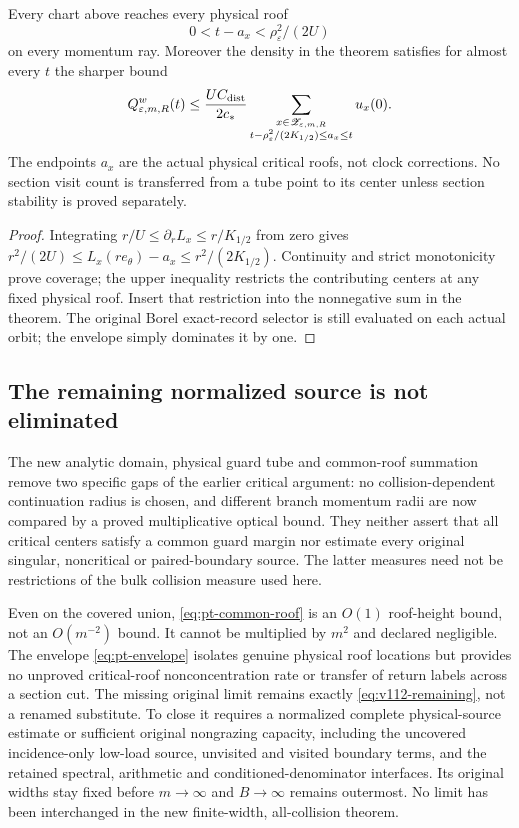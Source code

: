 \begin{corollary}
\label{cor:pt-envelope}
Every chart above reaches every physical roof
\[
 0<t-a_x<\rho_\varepsilon^2/(2U)
\]
on every momentum ray.  Moreover the density in the theorem satisfies
for almost every $t$ the sharper bound
\begin{equation}\label{eq:pt-envelope}
 Q^w_{\varepsilon,m,R}(t)
 \le\frac{U C_{\rm dist}}{2c_*}
 \sum_{\substack{x\in\mathscr Z_{\varepsilon,m,R}\\
       t-\rho_\varepsilon^2/(2K_{1/2})\le a_x\le t}}u_x(0).
\end{equation}
The endpoints $a_x$ are the actual physical critical roofs, not clock
corrections.  No section visit count is transferred from a tube point
to its center unless section stability is proved separately.
\end{corollary}
\begin{proof}
Integrating $r/U\le\partial_rL_x\le r/K_{1/2}$ from zero gives
$r^2/(2U)\le L_x(re_\theta)-a_x\le r^2/(2K_{1/2})$.
Continuity and strict monotonicity prove coverage; the upper inequality
restricts the contributing centers at any fixed physical roof.
Insert that restriction into the nonnegative sum in the theorem.
The original Borel exact-record selector is still evaluated on each
actual orbit; the envelope simply dominates it by one.
\end{proof}

\subsection{The remaining normalized source is not eliminated}
The new analytic domain, physical guard tube and common-roof summation
remove two specific gaps of the earlier critical argument: no
collision-dependent continuation radius is chosen, and different
branch momentum radii are now compared by a proved multiplicative
optical bound.  They neither assert that all critical centers satisfy
a common guard margin nor estimate every original singular, noncritical
or paired-boundary source.  The latter measures need not be restrictions
of the bulk collision measure used here.

Even on the covered union, \eqref{eq:pt-common-roof} is an $O(1)$
roof-height bound, not an $O(m^{-2})$ bound.  It cannot be multiplied
by $m^2$ and declared negligible.  The envelope
\eqref{eq:pt-envelope} isolates genuine physical roof locations but
provides no unproved critical-roof nonconcentration rate or transfer
of return labels across a section cut.  The missing original limit
remains exactly \eqref{eq:v112-remaining}, not a renamed substitute.
To close it requires a normalized complete physical-source estimate or
sufficient original nongrazing capacity, including the uncovered
incidence-only low-load source, unvisited and visited boundary terms,
and the retained spectral, arithmetic and conditioned-denominator
interfaces.  Its original widths stay fixed before $m\to\infty$
and $B\to\infty$ remains outermost.  No limit has been interchanged
in the new finite-width, all-collision theorem.
